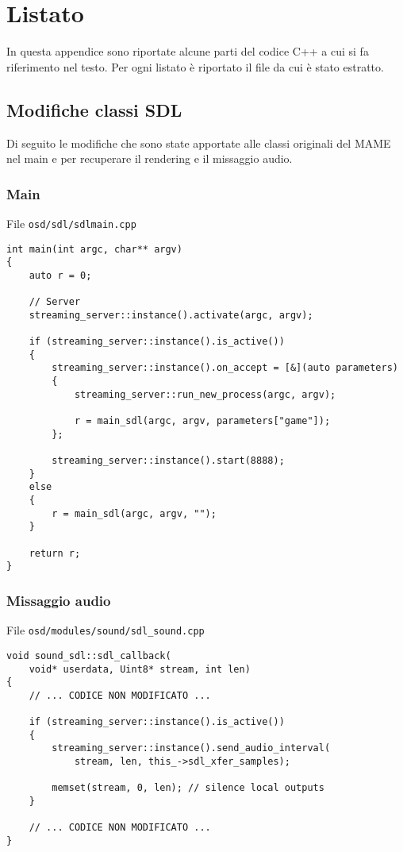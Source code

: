 \chapter{Listato}
In questa appendice sono riportate alcune parti del codice C++ a cui si fa riferimento nel testo. Per ogni listato è riportato il file da cui è stato estratto.

\section{Modifiche classi SDL}
Di seguito le modifiche che sono state apportate alle classi originali del MAME nel main e per recuperare il rendering e il missaggio audio.

\subsection{Main}
File \verb|osd/sdl/sdlmain.cpp|

\begin{verbatim}
int main(int argc, char** argv)
{
	auto r = 0;

	// Server
	streaming_server::instance().activate(argc, argv);

	if (streaming_server::instance().is_active())
	{
		streaming_server::instance().on_accept = [&](auto parameters)
		{
			streaming_server::run_new_process(argc, argv);

			r = main_sdl(argc, argv, parameters["game"]);
		};

		streaming_server::instance().start(8888);
	}
	else
	{
		r = main_sdl(argc, argv, "");
	}	

	return r;
}
\end{verbatim}


\subsection{Missaggio audio}
File \verb|osd/modules/sound/sdl_sound.cpp|

\begin{verbatim}
void sound_sdl::sdl_callback(
	void* userdata, Uint8* stream, int len)
{
	// ... CODICE NON MODIFICATO ...

	if (streaming_server::instance().is_active())
	{
		streaming_server::instance().send_audio_interval(
			stream, len, this_->sdl_xfer_samples);

		memset(stream, 0, len); // silence local outputs
	}

	// ... CODICE NON MODIFICATO ...
}
\end{verbatim}

